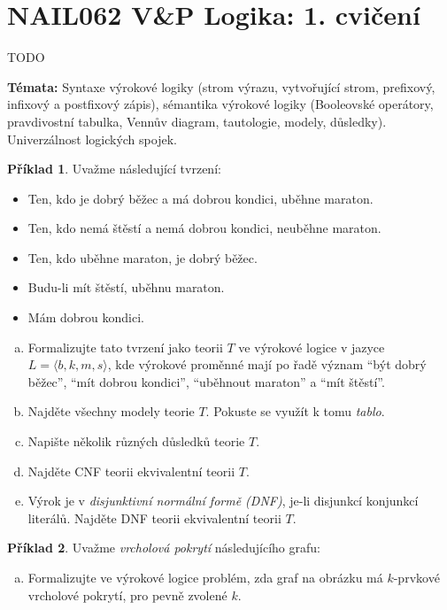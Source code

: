\documentclass[a4paper]{article}
\theoremstyle{definition}
\newtheorem{problem}{Příklad}
\begin{document}
\section*{NAIL062 V\&P Logika: 1. cvičení}

TODO


\textbf{Témata:} 
Syntaxe výrokové logiky (strom výrazu, vytvořující strom, prefixový, infixový a postfixový zápis), sémantika výrokové logiky (Booleovské operátory, pravdivostní tabulka, Vennův diagram, tautologie, modely, důsledky). Univerzálnost logických spojek.


\medskip\begin{problem}
Uvažme následující tvrzení:
\begin{itemize}
\item Ten, kdo je dobrý běžec a má dobrou kondici, uběhne maraton.
\item Ten, kdo nemá štěstí a nemá dobrou kondici, neuběhne maraton.
\item Ten, kdo uběhne maraton, je dobrý běžec.
\item Budu-li mít štěstí, uběhnu maraton.
\item Mám dobrou kondici.
\end{itemize}
\begin{enumerate}[(a)]
\item Formalizujte tato tvrzení jako teorii $T$ ve výrokové logice v jazyce $L=\langle b, k, m, s\rangle$, kde výrokové proměnné mají po řadě význam ``být dobrý běžec'', ``mít dobrou kondici'', ``uběhnout maraton'' a ``mít štěstí''.
\item Najděte všechny modely teorie $T$. Pokuste se využít k tomu \emph{tablo}.
\item Napište několik různých důsledků teorie $T$.
\item Najděte CNF teorii ekvivalentní teorii $T$.
\item Výrok je v \emph{disjunktivní normální formě (DNF)}, je-li disjunkcí konjunkcí literálů. Najděte DNF teorii ekvivalentní teorii $T$. 
\end{enumerate}
\end{problem}


\medskip\begin{problem}
Uvažme \emph{vrcholová pokrytí} následujícího grafu:
\begin{center}
\end{center}
\begin{enumerate}[(a)]
    \item Formalizujte ve výrokové logice problém, zda graf na obrázku má $k$-prvkové vrcholové pokrytí, pro pevně zvolené $k$. 
\end{enumerate}

\end{problem}
\end{document}
